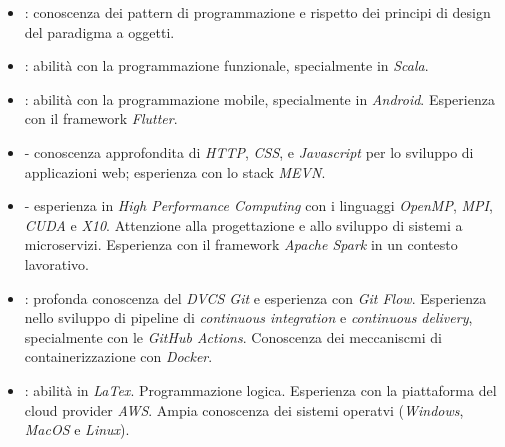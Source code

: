 \documentclass[letterpaper]{template-ita} %
\begin{document}
\begin{itemize}
    \item {}: conoscenza dei pattern di programmazione e rispetto dei principi di design del paradigma a oggetti.
    \item {}: abilità con la programmazione funzionale, specialmente in \textit{Scala}.
    \item {}: abilità con la programmazione mobile, specialmente in \textit{Android}. Esperienza con il framework \textit{Flutter}.
    \item {} - conoscenza approfondita di \textit{HTTP}, \textit{CSS}, e \textit{Javascript} per lo sviluppo di applicazioni web; esperienza con lo stack \textit{MEVN}.
    \item {} - esperienza in \textit{High Performance Computing} con i linguaggi \textit{OpenMP}, \textit{MPI}, \textit{CUDA} e \textit{X10}.
        Attenzione alla progettazione e allo sviluppo di sistemi a microservizi.
        Esperienza con il framework \textit{Apache Spark} in un contesto lavorativo.
    \item {}: profonda conoscenza del \textit{DVCS Git} e esperienza con \textit{Git Flow}.
        Esperienza nello sviluppo di pipeline di \textit{continuous integration} e \textit{continuous delivery}, specialmente con le \textit{GitHub Actions}.
        Conoscenza dei meccaniscmi di containerizzazione con \textit{Docker}.
    \item {}: abilità in \textit{LaTex}.
        Programmazione logica.
        Esperienza con la piattaforma del cloud provider \textit{AWS}.
        Ampia conoscenza dei sistemi operatvi (\textit{Windows}, \textit{MacOS} e \textit{Linux}).
\end{itemize}
\end{document}
